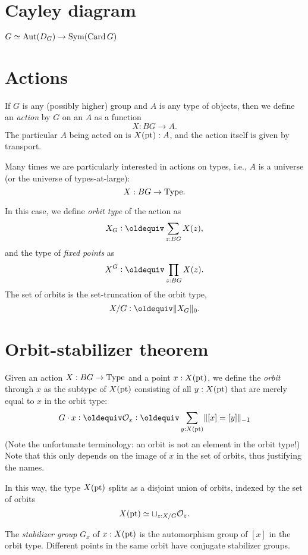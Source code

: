 \label{ch:symmetry}

\section{Cayley diagram}
\label{sec:cayley-diagram}

$G \simeq \operatorname{Aut}(D_G) \to \operatorname{Sym}(\operatorname{Card} G)$

\section{Actions}
\label{sec:actions}

If $G$ is any (possibly higher) group and $A$ is any type of objects,
then we define an \emph{action} by $G$ on an $A$ as a function
\[
  X : BG \to A.
\]
The particular $A$ being acted on is $X({\mathord{\mathrm{pt}}}):A$,
and the action itself is given by transport.

Many times we are particularly interested in actions on types,
i.e., $A$ is a universe (or the universe of types-at-large):
\[
  X : BG \to \mathord{\mathrm{Type}}.
\]

In this case, we define \emph{orbit type} of the action as
\[
  X_G \defeq \sum_{z:BG} X(z),
\]
and the type of \emph{fixed points} as
\[
  X^G \defeq \prod_{z:BG} X(z).
\]
The set of orbits is the set-truncation of the orbit type,
\[
  X / G \defeq \Trunc{X_G}_0.
\]

\section{Orbit-stabilizer theorem}
\label{sec:orbit-stabilizer-theorem}

Given an action $X : BG \to \mathord{\mathrm{Type}}$ and a point $x : X({\mathord{\mathrm{pt}}})$, we define
the \emph{orbit} through $x$ as the subtype of $X({\mathord{\mathrm{pt}}})$ consisting of
all $y : X({\mathord{\mathrm{pt}}})$ that are merely equal to $x$ in the orbit type:
\[
  G\cdot x \defeq \mathcal O_x \defeq \sum_{y : X(\pt)} \merely{[x] = [y]}
\]
(Note the unfortunate terminology: an orbit is not an element in the
orbit type!)
Note that this only depends on the image of $x$ in the set of orbits,
thus justifying the names.

In this way, the type $X({\mathord{\mathrm{pt}}})$ splits as a disjoint union of orbits,
indexed by the set of orbits
\[
  X({\mathord{\mathrm{pt}}}) \simeq \sqcup_{z : X / G} \mathcal O_z.
\]

The \emph{stabilizer group} $G_x$ of $x : X({\mathord{\mathrm{pt}}})$ is the automorphism group of $[x]$ in the orbit type.
Different points in the same orbit have conjugate stabilizer groups.

